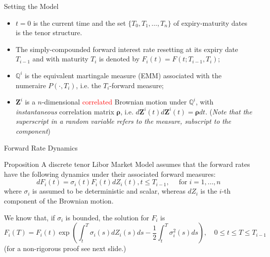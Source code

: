 \documentclass{beamer}
\begin{document}
\begin{frame}{Setting the Model}
  \begin{itemize}
  \item<1-> $t = 0$ is the current time and the set $\{T_0, T_1, \dots, T_n\}$ of expiry-maturity dates is the tenor structure. %
  \item<2-> The simply-compounded forward interest rate resetting at its expiry date $T_{i-1}$ and with maturity $T_i$ is denoted by $F_i(t) = F(t; T_{i-1}, T_i)$;
  \item<3-> $\mathbb{Q}^i$ is the equivalent martingale measure (EMM) associated with the numeraire $P(\cdot, T_i)$, i.e. the $T_i$-forward measure;
  \item<4-> $\bm{Z}^i$ is a $n$-dimensional \textcolor{red}{correlated} Brownian motion under $\mathbb{Q}^i$, with \emph{instantaneous} correlation matrix $\bm{\rho}$, i.e. $d\bm{Z}^i(t) d\bm{Z}^i(t) = \bm{\rho} dt$. (\emph{Note that the superscript in a random variable refers to the measure, subscript to the component})
  \end{itemize}
\end{frame}

\begin{frame}{Forward Rate Dynamics}
  \begin{block}{Proposition}
    A discrete tenor Libor Market Model assumes that the forward rates have the following dynamics under their associated forward measures:
    \begin{equation}
      dF_i(t) = \sigma_i(t)F_i(t)dZ_i(t), t \le T_{i-1},\quad\text{ for } i = 1,\ldots, n
      \label{eq:forward_process_lmm}
    \end{equation}
    where $\sigma_i$ is assumed to be deterministic and scalar, whereas $dZ_i$ is the $i$-th component of the Brownian motion.
  \end{block}
\pause
  We know that, if $\sigma_i$ is bounded, the solution for $F_i$ is 
  \begin{equation*}
    F_i(T) = F_i(t) \exp\left(\int_t^T\sigma_i(s)dZ_i(s)ds - \frac{1}{2}\int_t^T 
    \sigma_i^2(s)ds\right),\quad 0\le t \le T \le T_{i-1} 
  \end{equation*}
  (for a non-rigorous proof see next slide.)
\end{frame}
\end{document}
